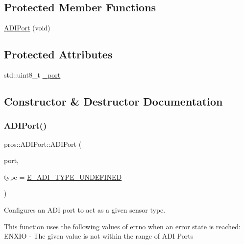 \subsection*{Protected Member Functions}
\begin{DoxyCompactItemize}
\item 
\hyperlink{classpros_1_1ADIPort_a7f44b44ce0528ea4c5ef83ed8465e72d}{A\+D\+I\+Port} (void)
\end{DoxyCompactItemize}
\subsection*{Protected Attributes}
\begin{DoxyCompactItemize}
\item 
std\+::uint8\+\_\+t \hyperlink{classpros_1_1ADIPort_a75f3b6c1ae3c1f6b755e18444e7559d6}{\+\_\+port}
\end{DoxyCompactItemize}


\subsection{Constructor \& Destructor Documentation}
\mbox{\label{classpros_1_1ADIPort_ab6ef7710de366895859d770ffb1d8cf1}} 
\subsubsection{\texorpdfstring{A\+D\+I\+Port()}{ADIPort()}\hspace{0.1cm}{\footnotesize\ttfamily [1/2]}}
{\footnotesize\ttfamily pros\+::\+A\+D\+I\+Port\+::\+A\+D\+I\+Port (\begin{DoxyParamCaption}\item[{std\+::uint8\+\_\+t}]{port,  }\item[{\hyperlink{adi_8h_a4efff81399e823764aa05cd5c172ea55}{adi\+\_\+port\+\_\+config\+\_\+e\+\_\+t}}]{type = {\ttfamily \hyperlink{adi_8h_ad5f9ddf0fd9de73c4b23fa5485144b7fa37e9d6ebc03d88c58db1904a7f2b7373}{E\+\_\+\+A\+D\+I\+\_\+\+T\+Y\+P\+E\+\_\+\+U\+N\+D\+E\+F\+I\+N\+ED}} }\end{DoxyParamCaption})}

Configures an A\+DI port to act as a given sensor type.

This function uses the following values of errno when an error state is reached\+: E\+N\+X\+IO -\/ The given value is not within the range of A\+DI Ports


